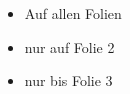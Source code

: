 \begin{frame}
  \begin{itemize}
    \item<1-> Auf allen Folien
    \item<2> nur auf Folie 2
    \item<-3> nur bis Folie 3
  \end{itemize}
\end{frame}
